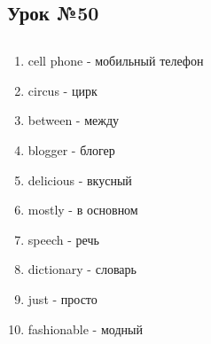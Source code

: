 \subsection{Урок №50}

\subsection*{}
\begin{multicols}{2}
    \begin{enumerate}\setlength{\itemsep}{0pt}
        \item cell phone - мобильный телефон
        \item circus - цирк
        \item between - между
        \item blogger - блогер
        \item delicious - вкусный
        \item mostly - в основном
        \item speech - речь
        \item dictionary - словарь
        \item just - просто
        \item fashionable - модный
    \end{enumerate}
\end{multicols}